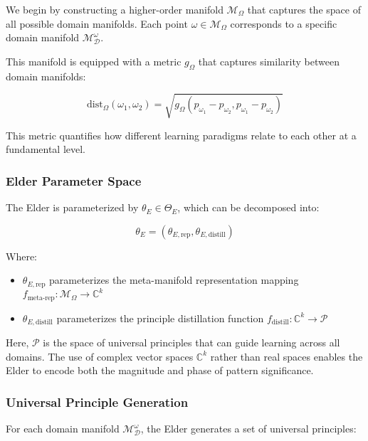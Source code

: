 We begin by constructing a higher-order manifold $\mathcal{M}_{\Omega}$ that captures the space of all possible domain manifolds. Each point $\omega \in \mathcal{M}_{\Omega}$ corresponds to a specific domain manifold $\mathcal{M}_{\mathcal{D}}^{\omega}$.

This manifold is equipped with a metric $g_{\Omega}$ that captures similarity between domain manifolds:

\begin{equation}
\text{dist}_{\Omega}(\omega_1, \omega_2) = \sqrt{g_{\Omega}(p_{\omega_1} - p_{\omega_2}, p_{\omega_1} - p_{\omega_2})}
\end{equation}

This metric quantifies how different learning paradigms relate to each other at a fundamental level.

\subsubsection{Elder Parameter Space}

The Elder is parameterized by $\theta_E \in \Theta_E$, which can be decomposed into:

\begin{equation}
\theta_E = (\theta_{E,\text{rep}}, \theta_{E,\text{distill}})
\end{equation}

Where:
\begin{itemize}
\item $\theta_{E,\text{rep}}$ parameterizes the meta-manifold representation mapping $f_{\text{meta-rep}} : \mathcal{M}_{\Omega} \rightarrow \mathbb{C}^{k}$
\item $\theta_{E,\text{distill}}$ parameterizes the principle distillation function $f_{\text{distill}} : \mathbb{C}^{k} \rightarrow \mathcal{P}$
\end{itemize}

Here, $\mathcal{P}$ is the space of universal principles that can guide learning across all domains. The use of complex vector spaces $\mathbb{C}^{k}$ rather than real spaces enables the Elder to encode both the magnitude and phase of pattern significance.

\subsubsection{Universal Principle Generation}

For each domain manifold $\mathcal{M}_{\mathcal{D}}^{\omega}$, the Elder generates a set of universal principles:

